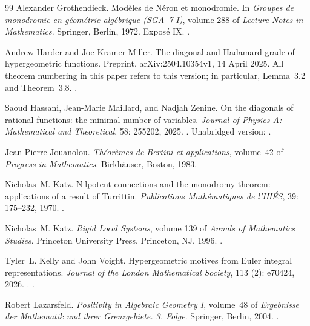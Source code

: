 \documentclass[11pt]{amsart}
\theoremstyle{definition}
\theoremstyle{remark}
\numberwithin{equation}{section}
\begin{document}
\begin{thebibliography}{99}
Alexander Grothendieck.
\newblock Mod{\`e}les de {N}{\'e}ron et monodromie.
\newblock In \emph{Groupes de monodromie en g{\'e}om{\'e}trie alg{\'e}brique
  ({SGA}~7 {I})}, volume 288 of \emph{Lecture Notes in Mathematics}. Springer,
  Berlin, 1972.
\newblock Expos{\'e} {IX}.
\newblock {}.

Andrew Harder and Joe Kramer-Miller.
\newblock The diagonal and Hadamard grade of hypergeometric functions.
\newblock Preprint, arXiv:2504.10354v1, 14 April 2025.
\newblock All theorem numbering in this paper refers to this version; in particular, Lemma~3.2 and Theorem~3.8.
\newblock {}.


Saoud Hassani, Jean-Marie Maillard, and Nadjah Zenine.
\newblock On the diagonals of rational functions: the minimal number of
  variables.
\newblock \emph{Journal of Physics A: Mathematical and Theoretical},
  58: 255202, 2025.
\newblock {}.
\newblock Unabridged version: .

Jean-Pierre Jouanolou.
\newblock \emph{Th{\'e}or{\`e}mes de {B}ertini et applications}, volume~42 of
  \emph{Progress in Mathematics}.
\newblock Birkh{\"a}user, Boston, 1983.

Nicholas~M. Katz.
\newblock Nilpotent connections and the monodromy theorem: applications of a
  result of {T}urrittin.
\newblock \emph{Publications Math{\'e}matiques de l'IH{\'E}S}, 39:
  175--232, 1970.
\newblock {}.

Nicholas~M. Katz.
\newblock \emph{Rigid Local Systems}, volume 139 of \emph{Annals of Mathematics
  Studies}.
\newblock Princeton University Press, Princeton, NJ, 1996.
\newblock {}.

Tyler~L. Kelly and John Voight.
\newblock Hypergeometric motives from {E}uler integral representations.
\newblock \emph{Journal of the London Mathematical Society}, 113
  (2): e70424, 2026.
\newblock {}.
\newblock {}.

Robert Lazarsfeld.
\newblock \emph{Positivity in Algebraic Geometry {I}}, volume~48 of
  \emph{Ergebnisse der Mathematik und ihrer Grenzgebiete. 3. Folge}.
\newblock Springer, Berlin, 2004.
\newblock {}.


\end{thebibliography}
\end{document}
